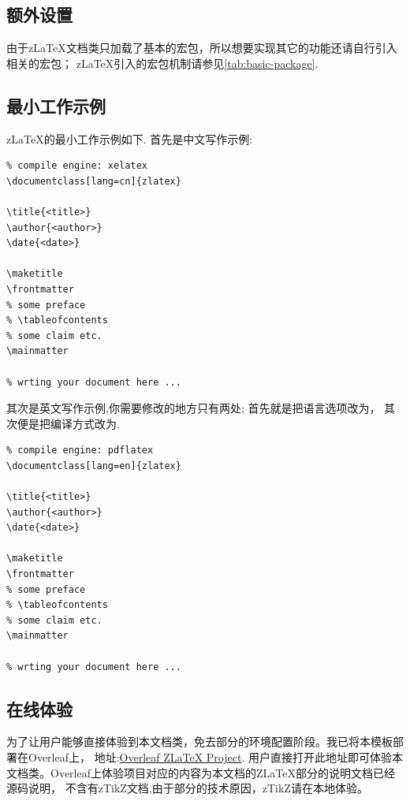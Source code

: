 \subsection{额外设置}
由于z\LaTeX{}文档类只加载了基本的宏包，所以想要实现其它的功能还请自行引入相关的宏包；
z\LaTeX{}引入的宏包机制请参见\cref{tab:basic-package}.

\subsection{最小工作示例}
z\LaTeX{}的最小工作示例如下.
首先是中文写作示例:

\begin{verbatim}
% compile engine: xelatex 
\documentclass[lang=cn]{zlatex}

\title{<title>}
\author{<author>}
\date{<date>}

\maketitle
\frontmatter
% some preface
% \tableofcontents
% some claim etc.
\mainmatter

% wrting your document here ...

\end{verbatim}

其次是英文写作示例,你需要修改的地方只有两处; 首先就是把语言选项改为，
其次便是把编译方式改为.

\begin{verbatim}
% compile engine: pdflatex 
\documentclass[lang=en]{zlatex}

\title{<title>}
\author{<author>}
\date{<date>}

\maketitle
\frontmatter
% some preface
% \tableofcontents
% some claim etc.
\mainmatter

% wrting your document here ...

\end{verbatim}

\subsection{在线体验}
为了让用户能够直接体验到本文档类，免去部分的环境配置阶段。我已将本模板部署在Overleaf上，
地址:\href{https://www.overleaf.com/project/661fd2772cafbff9df5e6fb4}{Overleaf ZLaTeX Project}.
用户直接打开此地址即可体验本文档类。Overleaf上体验项目对应的内容为本文档的Z\LaTeX{}部分的说明文档已经源码说明，
不含有zTikZ文档,由于部分的技术原因，zTikZ请在本地体验。

